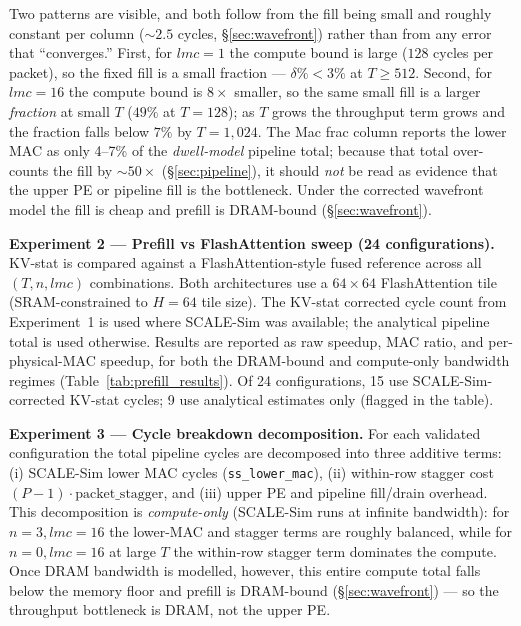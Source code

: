 \documentclass[11pt]{article}
\begin{document}
Two patterns are visible, and both follow from the fill being small and
roughly constant per column (\(\sim\!2.5\) cycles, \S\ref{sec:wavefront})
rather than from any error that ``converges.''
First, for \(lmc = 1\) the compute bound is large (\(128\) cycles per packet),
so the fixed fill is a small fraction --- \(\delta\% < 3\%\) at \(T \geq 512\).
Second, for \(lmc = 16\) the compute bound is \(8\times\) smaller, so the same
small fill is a larger \emph{fraction} at small \(T\) (\(49\%\) at \(T = 128\));
as \(T\) grows the throughput term grows and the fraction falls below \(7\%\)
by \(T = 1{,}024\).
The Mac frac column reports the lower MAC as only 4--7\% of the
\emph{dwell-model} pipeline total; because that total over-counts the fill by
\(\sim\!50\times\) (\S\ref{sec:pipeline}), it should \emph{not} be read as
evidence that the upper PE or pipeline fill is the bottleneck. Under the
corrected wavefront model the fill is cheap and prefill is DRAM-bound
(\S\ref{sec:wavefront}).

\textbf{Experiment 2 --- Prefill vs FlashAttention sweep (24 configurations).}
KV-stat is compared against a FlashAttention-style fused reference
across all \((T, n, lmc)\) combinations.
Both architectures use a \(64 \times 64\) FlashAttention tile
(SRAM-constrained to \(H = 64\) tile size).
The KV-stat corrected cycle count from Experiment~1 is used where
SCALE-Sim was available; the analytical pipeline total is used
otherwise.
Results are reported as raw speedup, MAC ratio, and per-physical-MAC
speedup, for both the DRAM-bound and compute-only bandwidth regimes
(Table~\ref{tab:prefill_results}).
Of 24 configurations, 15 use SCALE-Sim-corrected KV-stat cycles;
9 use analytical estimates only (flagged in the table).

\textbf{Experiment 3 --- Cycle breakdown decomposition.}
For each validated configuration the total pipeline cycles are
decomposed into three additive terms:
(i) SCALE-Sim lower MAC cycles (\texttt{ss\_lower\_mac}),
(ii) within-row stagger cost \((P-1) \cdot \text{packet\_stagger}\),
and (iii) upper PE and pipeline fill/drain overhead.
This decomposition is \emph{compute-only} (SCALE-Sim runs at infinite
bandwidth): for \(n=3, lmc=16\) the lower-MAC and stagger terms are
roughly balanced, while for \(n=0, lmc=16\) at large \(T\) the within-row
stagger term dominates the compute. Once DRAM bandwidth is modelled,
however, this entire compute total falls below the memory floor and
prefill is DRAM-bound (\S\ref{sec:wavefront}) --- so the throughput
bottleneck is DRAM, not the upper PE.
\end{document}
